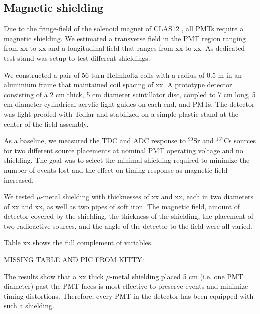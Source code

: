 \documentclass[3p,final,twocolumn]{elsarticle}
\begin{document}
\subsection{Magnetic shielding}
Due to the fringe-field of the solenoid magnet of CLAS12 \cite{Fair:2020yfx}, all PMTs require a magnetic shielding. We estimated a transverse field in the  PMT region ranging from xx to xx and a longitudinal field that ranges from xx to xx. As dedicated test stand was setup to test different shieldings.

We constructed a pair of 56-turn Helmholtz coils with a radius of 0.5 \si{\meter} in an aluminium frame that maintained coil spacing of xx. A prototype detector consisting of a 2 \si{\centi\meter} thick, 5 \si{\centi\meter} diameter scintillator disc, coupled to 7 \si{\centi\meter} long, 5 \si{\centi\meter} diameter cylindrical acrylic light guides on each end, and PMTs. The detector was light-proofed with Tedlar and stabilized on a simple plastic stand at the center of the field assembly. 

As a baseline, we measured the TDC and ADC response to $^{90}$Sr and $^{137}$Cs sources for two different source placements at nominal PMT operating voltage and no shielding. 
The goal was to select the minimal shielding required to minimize the number of events lost and the effect on timing response as  magnetic field increased.

We tested $\mu$-metal shielding with thicknesses of xx and xx, each in two diameters of xx and xx, as well as two pipes of soft iron. The magnetic field, amount of detector covered by the shielding, the thickness of the shielding, the placement of two radioactive sources, and the angle of the detector to the field were all varied. 

Table xx shows the full complement of variables.

{\color{red}MISSING TABLE AND PIC FROM KITTY:}


The results show that a xx thick $\mu$-metal shielding placed 5 \si{\centi\meter} (i.e. one PMT diameter) past the PMT faces is most effective to preserve events and minimize timing distortions. Therefore, every PMT in the detector has been equipped with such a shielding. 
\end{document}
